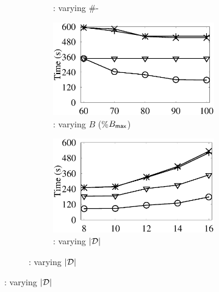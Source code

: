 \begin{figure}[tb!]
\begin{subfigure}[b]{1.00\textwidth}
\begin{subfigure}[b]{0.256\textwidth}
          \begin{center}
            \vspace{-2ex}\caption{\tpch: varying \#-}
            \label{tpch-1-vary-join}
          \end{center}
          \vspace{-1ex}
        \end{subfigure}
        \hspace{-2.8ex}
  		\begin{subfigure}[b]{0.256\textwidth}
          \centering
          \includegraphics[width=1\textwidth]{fig/vary_b_tpch.eps}
          \begin{center}
            \vspace{-2ex}\caption{\tpch: varying $B$ (\%$B_{\protect\mathsf{max}}$)}
            \label{tpch-1-varyB}
          \end{center}
          \vspace{-1ex}
        \end{subfigure}
        \hspace{-2.8ex}
  		\begin{subfigure}[b]{0.256\textwidth}
          \centering
          \includegraphics[width=1\textwidth]{fig/vary_d_tpch.eps}
          \begin{center}
            \vspace{-2ex}\caption{\tpch: varying $|\mathcal D|$}
            \label{tpch-1-varyD}
          \end{center}
          \vspace{-1ex}
        \end{subfigure}


\end{subfigure}
\end{figure}
